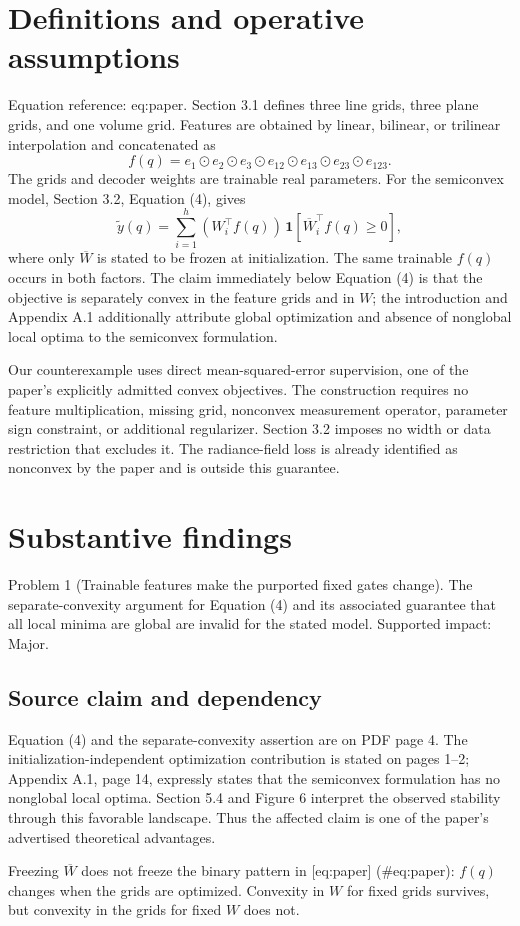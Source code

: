 \documentclass[10pt]{article}
\begin{document}
\section*{Definitions and operative assumptions}
Equation reference: eq:paper. Section 3.1 defines three line grids, three plane grids, and one volume grid. Features are obtained by linear, bilinear, or trilinear interpolation and concatenated as \[f(q)=e_1\odot e_2\odot e_3\odot e_{12}\odot e_{13}\odot e_{23}\odot e_{123}.\] The grids and decoder weights are trainable real parameters. For the semiconvex model, Section 3.2, Equation (4), gives \[
\widetilde y(q)=\sum_{i=1}^{h} (W_i^\top f(q))\,
       \mathbf{1}[\overline W_i^\top f(q)\geq0],\] where only \(\overline W\) is stated to be frozen at initialization. The same trainable \(f(q)\) occurs in both factors. The claim immediately below Equation (4) is that the objective is separately convex in the feature grids and in \(W\); the introduction and Appendix A.1 additionally attribute global optimization and absence of nonglobal local optima to the semiconvex formulation.\par
Our counterexample uses direct mean-squared-error supervision, one of the paper’s explicitly admitted convex objectives. The construction requires no feature multiplication, missing grid, nonconvex measurement operator, parameter sign constraint, or additional regularizer. Section 3.2 imposes no width or data restriction that excludes it. The radiance-field loss is already identified as nonconvex by the paper and is outside this guarantee.\par
\section*{Substantive findings}
Problem 1 (Trainable features make the purported fixed gates change).  The separate-convexity argument for Equation (4) and its associated guarantee that all local minima are global are invalid for the stated model. Supported impact: Major.\par
\subsection*{Source claim and dependency}
Equation (4) and the separate-convexity assertion are on PDF page 4. The initialization-independent optimization contribution is stated on pages 1–2; Appendix A.1, page 14, expressly states that the semiconvex formulation has no nonglobal local optima. Section 5.4 and Figure 6 interpret the observed stability through this favorable landscape. Thus the affected claim is one of the paper’s advertised theoretical advantages.\par
Freezing \(\overline W\) does not freeze the binary pattern in [eq:paper] (\#eq:paper): \(f(q)\) changes when the grids are optimized. Convexity in \(W\) for fixed grids survives, but convexity in the grids for fixed \(W\) does not.\par
\end{document}
